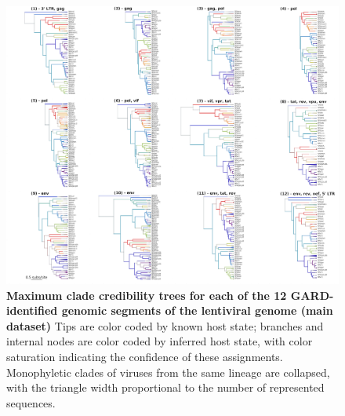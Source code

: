 \begin{figure}[ht!]
  \begin{centering}
    \includegraphics[width=\linewidth]{./png/siv_maindata_trees.png}
  	\caption[Phylogenies of each segment of the lentiviral genome (main dataset)]{\textbf{Maximum clade credibility trees for each of the 12 GARD-identified genomic segments of the lentiviral genome (main dataset) }
Tips are color coded by known host state; branches and internal nodes are color coded by inferred host state, with color saturation indicating the confidence of these assignments.
Monophyletic clades of viruses from the same lineage are collapsed, with the triangle width proportional to the number of represented sequences.
        }
  	\label{siv_maindata_trees}
  \end{centering}
\end{figure}

